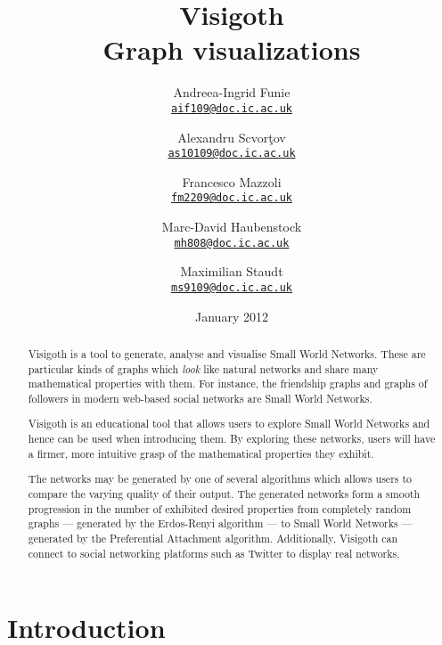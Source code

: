 \documentclass[a4paper,11pt,titlepage]{article}
\newcommand{\mailto}[1]{\href{mailto:#1}{\texttt{#1}}}
\let\stdsection\section         %
\renewcommand{\section}{\newpage\stdsection}
\begin{document}
\title{\Huge Visigoth\\\Large Graph visualizations}
\author{
  Andreea-Ingrid Funie\\\mailto{aif109@doc.ic.ac.uk}\and
  Alexandru Scvor\c tov\\\mailto{as10109@doc.ic.ac.uk}\and
  Francesco Mazzoli\\\mailto{fm2209@doc.ic.ac.uk}\and
  Marc-David Haubenstock\\\mailto{mh808@doc.ic.ac.uk}\and
  Maximilian Staudt\\\mailto{ms9109@doc.ic.ac.uk}
}
\date{January 2012}
\maketitle

\begin{abstract}

Visigoth is a tool to generate, analyse and visualise Small World
Networks. These are particular kinds of graphs which \emph{look} like
natural networks and share many mathematical properties with them.
For instance, the friendship graphs and graphs of followers in modern
web-based social networks are Small World Networks.

Visigoth is an educational tool that allows users to explore Small
World Networks and hence can be used when introducing them. By
exploring these networks, users will have a firmer, more intuitive
grasp of the mathematical properties they exhibit.

The networks may be generated by one of several algorithms which
allows users to compare the varying quality of their output. The
generated networks form a smooth progression in the number of
exhibited desired properties from completely random graphs ---
generated by the Erdos-Renyi algorithm --- to Small World Networks ---
generated by the Preferential Attachment algorithm. Additionally,
Visigoth can connect to social networking platforms such as Twitter to
display real networks.
\end{abstract}

\tableofcontents



\section{Introduction}

\end{document}

